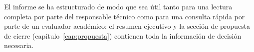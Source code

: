 El informe se ha estructurado de modo que sea \'util tanto para una
lectura completa por parte del responsable t\'ecnico como para una
consulta r\'apida por parte de un evaluador acad\'emico: el resumen
ejecutivo y la secci\'on de propuesta de cierre (cap\'itulo~\ref{cap:propuesta})
contienen toda la informaci\'on de decisi\'on necesaria.
